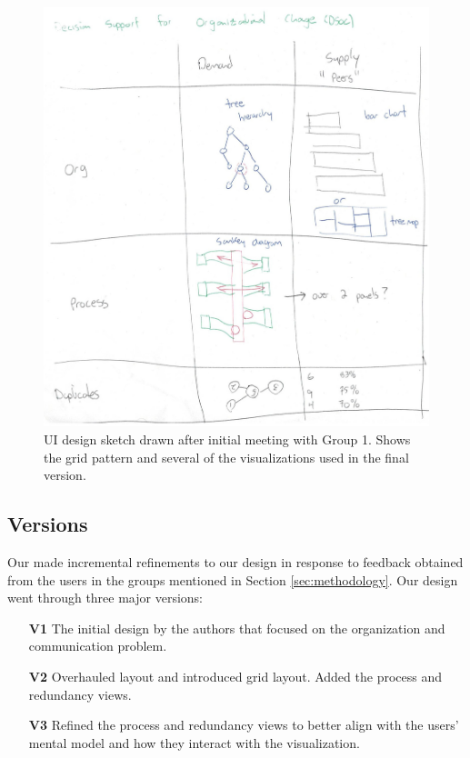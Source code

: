 \documentclass[journal]{vgtc}                %
\begin{document}
\begin{figure}
	\centering
	\includegraphics[width=\columnwidth]{pictures/Sketch.jpg}
	\caption{UI design sketch drawn after initial meeting with Group 1. Shows the grid pattern and several of the visualizations used in the final version.}
	\label{fig:sketch}
\end{figure}

\subsection{Versions}

Our made incremental refinements to our design in response to feedback obtained from the users in the groups mentioned in Section \ref{sec:methodology}. Our design went through three major versions:

\begin{enumerate}
	\item [\textbf{V1}] The initial design by the authors that focused on the organization and communication problem.
	\item [\textbf{V2}] Overhauled layout and introduced grid layout. Added the process and redundancy views.
	\item [\textbf{V3}] Refined the process and redundancy views to better align with the users' mental model and how they interact with the visualization.
\end{enumerate}
\end{document}
